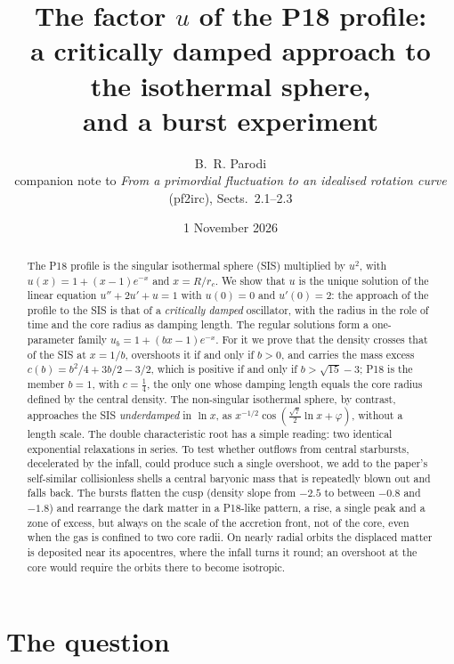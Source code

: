 \documentclass[11pt,a4paper]{article}
\title{The factor $u$ of the P18 profile:\\ a critically damped approach to the isothermal sphere,\\ and a burst experiment}
\author{B.~R. Parodi\\[2pt]\small companion note to \emph{From a primordial fluctuation to an idealised
rotation curve} (pf2irc), Sects.~2.1--2.3}
\date{1 November 2026}
\theoremstyle{remark}
\newcommand{\rc}{r_c}
\begin{document}
\maketitle

\begin{abstract}
\noindent The P18 profile is the singular isothermal sphere (SIS) multiplied by $u^2$,
with $u(x)=1+(x-1)e^{-x}$ and $x=R/\rc$. We show that $u$ is the unique solution of the
linear equation $u''+2u'+u=1$ with $u(0)=0$ and $u'(0)=2$: the approach of the profile
to the SIS is that of a \emph{critically damped} oscillator, with the radius in the role
of time and the core radius as damping length. The regular solutions form a
one-parameter family $u_b=1+(bx-1)e^{-x}$. For it we prove that the density crosses
that of the SIS at $x=1/b$, overshoots it if and only if $b>0$, and carries the mass
excess $c(b)=b^2/4+3b/2-3/2$, which is positive if and only if $b>\sqrt{15}-3$; P18 is
the member $b=1$, with $c=\tfrac14$, the only one whose damping length equals the core
radius defined by the central density. The non-singular isothermal sphere, by contrast,
approaches the SIS \emph{underdamped} in $\ln x$, as $x^{-1/2}\cos(\tfrac{\sqrt7}{2}\ln
x+\varphi)$, without a length scale. The double characteristic root has a simple reading:
two identical exponential relaxations in series. To test whether outflows from central
starbursts, decelerated by the infall, could produce such a single overshoot, we add to
the paper's self-similar collisionless shells a central baryonic mass that is repeatedly
blown out and falls back. The bursts flatten the cusp (density slope from $-2.5$ to
between $-0.8$ and $-1.8$) and rearrange the dark matter in a P18-like pattern, a rise,
a single peak and a zone of excess, but always on the scale of the accretion front, not
of the core, even when the gas is confined to two core radii. On nearly radial orbits
the displaced matter is deposited near its apocentres, where the infall turns it round;
an overshoot at the core would require the orbits there to become isotropic.
\end{abstract}

\tableofcontents
\bigskip

\section{The question}
\end{document}
